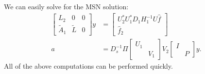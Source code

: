 \noindent
We can easily solve for the MSN solution:
%
\begin{align}
    \begin{bmatrix} L_{2} & 0 & 0 \\
        \widetilde{A}_{1} & \widetilde{L} & 0 \end{bmatrix} y &= 
        \begin{bmatrix} U_{2}^{*} U_{1}^{*} D_{1} H_{1}^{-1}U\hat{f} \\
            \hat{f}_{2} \end{bmatrix} \nonumber\\
    a &= D_{s}^{-1} \Pi \begin{bmatrix} U_{1} & \\ & V_{1} \end{bmatrix}
            V_{2} \begin{bmatrix} I & \\ & P \end{bmatrix}y.
\end{align}
%
All of the above computations can be performed quickly.


